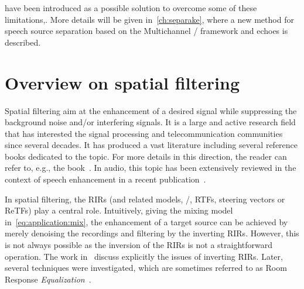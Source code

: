  have been introduced as a possible solution to overcome some of these limitations,.
More details will be given in~\cref{ch:separake}, where a new method for speech source separation based on the Multichannel \NMF/ framework and echoes is described.

\section{Overview on spatial filtering}\label{sec:application:filtering}
Spatial filtering aim at the enhancement of a desired signal while suppressing the background noise and/or interfering signals.
It is a large and active research field that has interested the signal processing and telecommunication communities since several decades.
It has produced a vast literature including several reference books dedicated to the topic.
For more details in this direction, the reader can refer to, e.g., the book~.
In audio, this topic has been extensively reviewed in the context of speech enhancement in a recent publication~.

\mynewline
In spatial filtering, the \acp{RIR} (and related models, \eg/, \acp{RTF}, steering vectors or \acp{ReTF}) play a central role.
Intuitively, giving the mixing model in~\cref{eq:application:mix}, the enhancement of a target source can be achieved by merely denoising the recordings and filtering by the inverting \acp{RIR}.
However, this is not always possible as the inversion of the \acp{RIR} is not a straightforward operation.
The work in~ discuss explicitly the issues of inverting \acp{RIR}.
Later, several techniques were investigated, which are sometimes referred to as Room Response \textit{Equalization}~.


